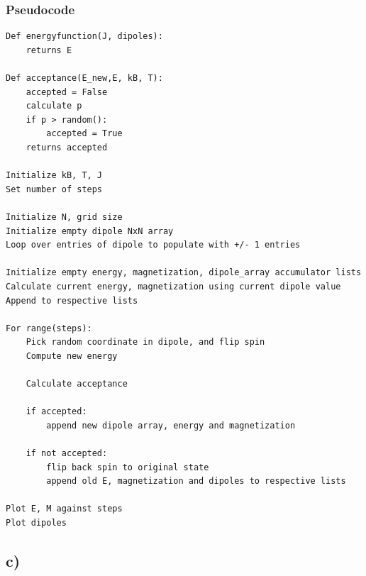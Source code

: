 \documentclass{article}
\begin{document}
\subsubsection*{Pseudocode}
\begin{verbatim}
Def energyfunction(J, dipoles):
    returns E
    
Def acceptance(E_new,E, kB, T): 
    accepted = False
    calculate p 
    if p > random(): 
        accepted = True 
    returns accepted

Initialize kB, T, J
Set number of steps 

Initialize N, grid size
Initialize empty dipole NxN array 
Loop over entries of dipole to populate with +/- 1 entries 

Initialize empty energy, magnetization, dipole_array accumulator lists 
Calculate current energy, magnetization using current dipole value 
Append to respective lists

For range(steps): 
    Pick random coordinate in dipole, and flip spin
    Compute new energy 
    
    Calculate acceptance 
    
    if accepted: 
        append new dipole array, energy and magnetization
    
    if not accepted: 
        flip back spin to original state
        append old E, magnetization and dipoles to respective lists

Plot E, M against steps
Plot dipoles 
\end{verbatim}

\subsection*{c)}
\end{document}
